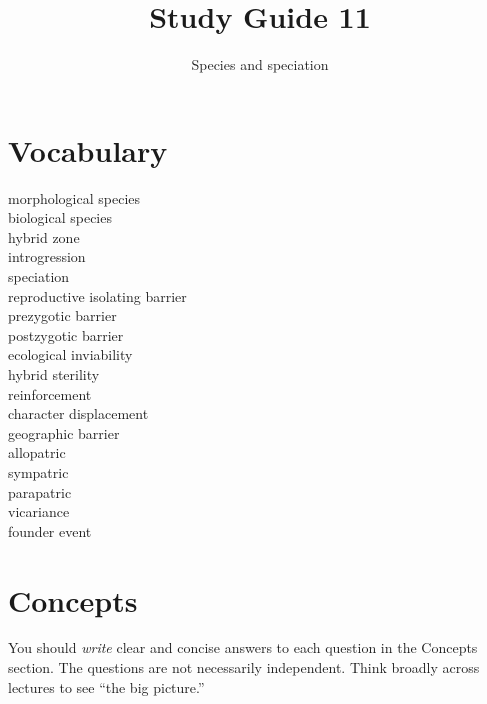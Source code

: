 \documentclass[letterpaper]{tufte-handout}
\title{Study Guide 11\hfill}
\author{Species and speciation}
\date{} %
\begin{document}
\maketitle	%

\section{Vocabulary}

\begin{multicols}{2}
morphological species\\
biological species\\
hybrid zone \\
introgression \\
speciation\\
reproductive isolating barrier\\
prezygotic barrier \\
postzygotic barrier \\
ecological inviability\\
hybrid sterility\\
reinforcement \\
character displacement \\
geographic barrier \\
allopatric \\
sympatric \\
parapatric \\
vicariance \\
founder event
\end{multicols}


\section{Concepts}

You should \emph{write} clear and concise answers to each question in the Concepts section.  The questions are not necessarily independent.  Think broadly across lectures to see ``the big picture.'' 
\end{document}
